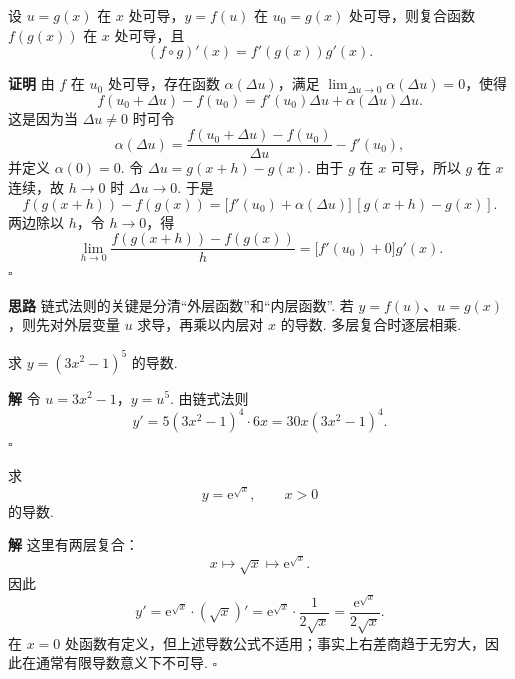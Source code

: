 \documentclass[fontset=fandol]{ctexart}
\newenvironment{proofdetail}{\par\noindent\textbf{证明}\quad}{\hfill$\square$\par\vspace{0.8em}}
\newenvironment{solution}{\par\noindent\textbf{解}\quad}{\hfill$\square$\par\vspace{0.8em}}
\newenvironment{idea}{\par\noindent\textbf{思路}\quad}{\par\vspace{0.4em}}
\newcommand{\dd}{\mathrm{d}}
\newcommand{\ee}{\mathrm{e}}
\begin{document}
\begin{theorem}[复合函数求导法则]
设 $u=g(x)$ 在 $x$ 处可导，$y=f(u)$ 在 $u_0=g(x)$ 处可导，则复合函数 $f(g(x))$ 在 $x$ 处可导，且
\[
(f\circ g)'(x)=f'(g(x))g'(x).
\]
\end{theorem}
\begin{proofdetail}
由 $f$ 在 $u_0$ 处可导，存在函数 $\alpha(\Delta u)$，满足 $\lim_{\Delta u\to0}\alpha(\Delta u)=0$，使得
\[
f(u_0+\Delta u)-f(u_0)=f'(u_0)\Delta u+\alpha(\Delta u)\Delta u.
\]
这是因为当 $\Delta u\neq0$ 时可令
\[
\alpha(\Delta u)=\frac{f(u_0+\Delta u)-f(u_0)}{\Delta u}-f'(u_0),
\]
并定义 $\alpha(0)=0$. 令 $\Delta u=g(x+h)-g(x)$. 由于 $g$ 在 $x$ 可导，所以 $g$ 在 $x$ 连续，故 $h\to0$ 时 $\Delta u\to0$. 于是
\[
f(g(x+h))-f(g(x))
=\bigl[f'(u_0)+\alpha(\Delta u)\bigr]\,[g(x+h)-g(x)].
\]
两边除以 $h$，令 $h\to0$，得
\[
\lim_{h\to0}\frac{f(g(x+h))-f(g(x))}{h}
=\bigl[f'(u_0)+0\bigr]g'(x).
\]
\end{proofdetail}

\begin{center}
\end{center}

\begin{idea}
链式法则的关键是分清“外层函数”和“内层函数”. 若 $y=f(u)$、$u=g(x)$，则先对外层变量 $u$ 求导，再乘以内层对 $x$ 的导数. 多层复合时逐层相乘.
\end{idea}

\begin{example}[公式求导]
求 $y=(3x^2-1)^5$ 的导数.
\end{example}
\begin{solution}
令 $u=3x^2-1$，$y=u^5$. 由链式法则
\[
y'=5(3x^2-1)^4\cdot6x=30x(3x^2-1)^4.
\]
\end{solution}

\begin{example}[多层复合求导]
求
\[
y=\ee^{\sqrt{x}},\qquad x>0
\]
的导数.
\end{example}
\begin{solution}
这里有两层复合：
\[
x\longmapsto \sqrt{x}\longmapsto \ee^{\sqrt{x}}.
\]
因此
\[
y'=\ee^{\sqrt{x}}\cdot(\sqrt{x})'
=\ee^{\sqrt{x}}\cdot\frac{1}{2\sqrt{x}}
=\frac{\ee^{\sqrt{x}}}{2\sqrt{x}}.
\]
在 $x=0$ 处函数有定义，但上述导数公式不适用；事实上右差商趋于无穷大，因此在通常有限导数意义下不可导.
\end{solution}
\end{document}
